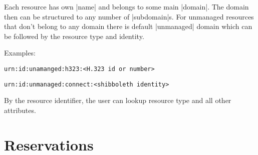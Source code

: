 \documentclass[a4paper]{report}
\makeatletter
\newcounter{UCcounter}
\newenvironment{UseCases}%
	{\begin{list}{\textbf{UC-\arabic{UCcounter}}}{\@nmbrlisttrue\def\@listctr{UCcounter}}}%
	{\end{list}}
\makeatother
\begin{document}
\begin{UseCases}
Each resource has own |name| and belongs to some main |domain|. The domain then can be structured to any number of |subdomain|s. For unmanaged resources that don't belong to any domain there is default |unmanaged| domain which can be followed by the resource type and identity.

Examples: 
\begin{compactitem}
\item \verb|urn:id:unamanged:h323:<H.323 id or number>|
\item \verb|urn:id:unmanaged:connect:<shibboleth identity>|
\end{compactitem}

By the resource identifier, the user can lookup resource type and all other attributes.

\end{UseCases}


\section{Reservations}
\end{document}

